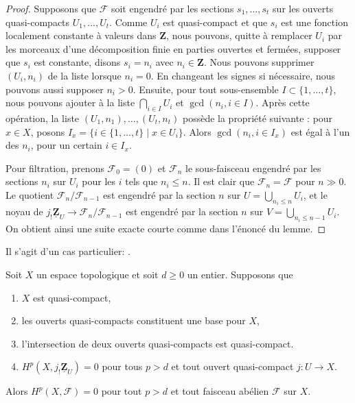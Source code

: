 \begin{proof}

Supposons que $\mathcal{F}$ soit engendré par les sections $s_1, \ldots, s_t$ sur les ouverts quasi-compacts $U_1, \ldots, U_t$. Comme $U_i$ est quasi-compact et que
$s_i$ est une fonction localement constante à valeurs dans $\mathbf{Z}$, nous pouvons, quitte à remplacer $U_i$ par les morceaux d'une décomposition finie en parties ouvertes et fermées, supposer que $s_i$ est constante, disons $s_i = n_i$ avec $n_i \in \mathbf{Z}$. Nous pouvons supprimer
$(U_i, n_i)$ de la liste lorsque $n_i = 0$. En changeant les signes si nécessaire, nous pouvons aussi supposer $n_i > 0$. Ensuite, pour tout sous-ensemble $I \subset \{1, \ldots, t\}$,
nous pouvons ajouter à la liste $\bigcap_{i \in I} U_i$ et $\gcd(n_i, i \in I)$. Après cette opération, la liste $(U_1, n_1), \ldots, (U_t, n_t)$
possède la propriété suivante : pour $x \in X$, posons $I_x = \{i \in \{1, \ldots, t\} \mid x \in U_i\}$. Alors $\gcd(n_i, i \in I_x)$ est égal à l'un des $n_i$, pour un certain $i \in I_x$.

\medskip\noindent
Pour filtration, prenons $\mathcal{F}_0 = (0)$ et $\mathcal{F}_n$ le sous-faisceau engendré par les sections $n_i$ sur $U_i$ pour les $i$ tels que $n_i \leq n$. Il est clair que $\mathcal{F}_n = \mathcal{F}$ pour $n \gg 0$. Le quotient $\mathcal{F}_n/\mathcal{F}_{n - 1}$ est engendré par la section $n$ sur $U = \bigcup_{n_i \leq n} U_i$, et le noyau de $j_!\underline{\mathbf{Z}}_U \to \mathcal{F}_n/\mathcal{F}_{n - 1}$ est engendré par la section $n$ sur $V = \bigcup_{n_i \leq n - 1} U_i$. On obtient ainsi une suite exacte courte comme dans l'énoncé du lemme.
\end{proof}

\begin{lemma}

\label{lemma-vanishing-generated-one-section}

\begin{reference}

Il s'agit d'un cas particulier: \cite[proposition 3.6.1]{Tohoku}.

\end{reference}

Soit $X$ un espace topologique et soit $d \geq 0$ un entier. Supposons que

\begin{enumerate}

\item  $X$ est quasi-compact,
\item les ouverts quasi-compacts constituent une base pour $X$,
\item l'intersection de deux ouverts quasi-compacts est quasi-compact.
\item  $H^p(X, j_!\underline{\mathbf{Z}}_U) = 0$ pour tous $p > d$
et tout ouvert quasi-compact $j : U \to X$.

\end{enumerate}

Alors $H^p(X, \mathcal{F}) = 0$ pour tout $p > d$
et tout faisceau abélien $\mathcal{F}$ sur $X$.

\end{lemma}

